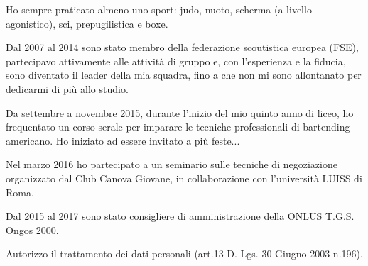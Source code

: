 \documentclass[10pt,a4paper]{altacv}
\begin{document}

\divider


Ho sempre praticato almeno uno sport: judo, nuoto, scherma (a livello agonistico), sci, prepugilistica e boxe.

\divider

Dal 2007 al 2014 sono stato membro della federazione scoutistica europea (FSE), partecipavo attivamente alle attività di gruppo e, con l'esperienza e la fiducia, sono diventato il leader della mia squadra, fino a che non mi sono allontanato per dedicarmi di più allo studio.

\divider

Da settembre a novembre 2015, durante l'inizio del mio quinto anno di liceo, ho frequentato un corso serale per imparare le tecniche professionali di bartending americano. Ho iniziato ad essere invitato a più feste...

\divider

Nel marzo  2016 ho partecipato a un seminario sulle tecniche di negoziazione organizzato dal Club Canova Giovane, in collaborazione con l'università LUISS di Roma.

\divider

Dal 2015 al 2017 sono stato consigliere di amministrazione della ONLUS T.G.S. Ongos 2000.





\bigskip

\begin{fullwidth}
\small
	\begin{center}
		Autorizzo il trattamento dei dati personali (art.13 D. Lgs. 30 Giugno 2003 n.196).
	\end{center}
\end{fullwidth}
\end{document}
